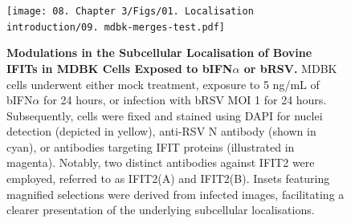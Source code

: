 \begin{figure}
    \centering
    \texttt{[image: 08. Chapter 3/Figs/01. Localisation introduction/09. mdbk-merges-test.pdf]}
    \caption[Modulations in the Subcellular Localisation of Bovine IFITs in MDBK Cells Exposed to bIFN\(\alpha\) or bRSV.]{\textbf{Modulations in the Subcellular Localisation of Bovine IFITs in MDBK Cells Exposed to bIFN\(\alpha\) or bRSV.} MDBK cells underwent either mock treatment, exposure to 5 ng/mL of bIFN\(\alpha\) for 24 hours, or infection with bRSV MOI 1 for 24 hours. Subsequently, cells were fixed and stained using DAPI for nuclei detection (depicted in yellow), anti-RSV N antibody (shown in cyan), or antibodies targeting IFIT proteins (illustrated in magenta). Notably, two distinct antibodies against IFIT2 were employed, referred to as IFIT2(A) and IFIT2(B). Insets featuring magnified selections were derived from infected images, facilitating a clearer presentation of the underlying subcellular localisations.}
    \label{fig:Modulations in the Subcellular Localisation of Bovine IFITs in MDBK Cells Exposed to bIFNa or bRSV}
\end{figure}

